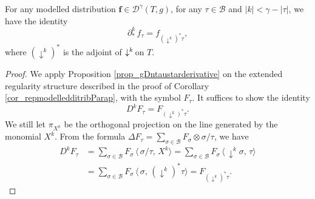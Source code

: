 \documentclass[11pt]{preprint}
\newcommand{\mcB}{\mathcal{B}}
\newcommand{\mcD}{\mathcal{D}}
\renewcommand{\lg}{\langle}
\newcommand{\rg}{\rangle}
\begin{document}
	\begin{proposition}\label{prop_starderiv_coefficientmodelleddist}
		For any modelled distribution ${\bm f}\in\mcD^\gamma(T,{ g})$, for any $\tau\in\mcB$ and $|k|<\gamma-|\tau|$, we have the identity
		$$
		\partial^k_* \, f_\tau = f_{(\downarrow^k)^*\tau},
		$$
		where $(\downarrow^k)^*$ is the adjoint of $\downarrow^k\hspace{-2pt}$ on $T$.
	\end{proposition}
	\begin{proof}
		We apply Proposition \ref{prop_gDntaustarderivative} on the extended regularity structure described in the proof of Corollary \ref{cor_repmodelledditribParap}, with the symbol $F_\tau$. It suffices to show the identity
		$$
		D^k F_\tau = F_{(\downarrow^k\hspace{0pt})^*\tau}.
		$$
		We still let $\pi_{X^k}$ be the orthogonal projection on the line generated by the monomial $X^k$. From the formula $\Delta F_\tau = \sum_{\sigma\in\mcB} F_\sigma \otimes \sigma/\tau$, we have
		\begin{align*}
			D^k F_\tau &= \sum_{\sigma\in\mcB}  F_\sigma \, \lg \, \sigma/\tau , \, X^k  \rg 
			=\sum_{\sigma\in\mcB} F_\sigma  \, \lg \, \downarrow^k\sigma, \, \tau  \rg  
			\\
			&= \sum_{\sigma\in\mcB}  F_\sigma \, \lg  \,  \sigma , \, (\downarrow^k)^* \tau   \rg 
			= F_{(\downarrow^k)^* \tau }.
		\end{align*}
	\end{proof}
	
	
	
	
	
	
	
	
\end{document}
